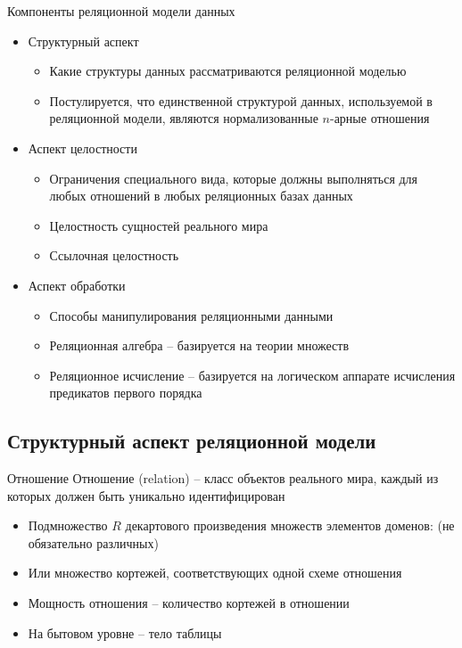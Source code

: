 \documentclass[12pt]{article}
\begin{document}
\begin{nota}{Компоненты реляционной модели данных}
    \begin{itemize}
        \item Структурный аспект 
        
        \begin{itemize}
            \item Какие структуры данных рассматриваются реляционной моделью 
            \item Постулируется, что единственной структурой данных, используемой в реляционной модели, являются нормализованные $n$-арные отношения
        \end{itemize}

        \item Аспект целостности 
        
        \begin{itemize}
            \item Ограничения специального вида, которые должны выполняться для любых отношений в любых реляционных базах данных 
            \item Целостность сущностей реального мира 
            \item Ссылочная целостность 
        \end{itemize}

        \item Аспект обработки 
        
        \begin{itemize}
            \item Способы манипулирования реляционными данными
            \item Реляционная алгебра -- базируется на теории множеств
            \item Реляционное исчисление -- базируется на логическом аппарате исчисления предикатов первого порядка 
        \end{itemize}
    \end{itemize}
\end{nota}

\newpage

\subsection{Структурный аспект реляционной модели}

\begin{defin}{Отношение}
    Отношение (relation) -- класс объектов реального мира, каждый из которых должен быть уникально идентифицирован

    \begin{itemize}
        \item Подмножество $R$ декартового произведения множеств элементов доменов: (не обязательно различных)
        \item Или множество кортежей, соответствующих одной схеме отношения 
        \item Мощность отношения -- количество кортежей в отношении
        \item На бытовом уровне -- тело таблицы
    \end{itemize}
\end{defin}
\end{document}
